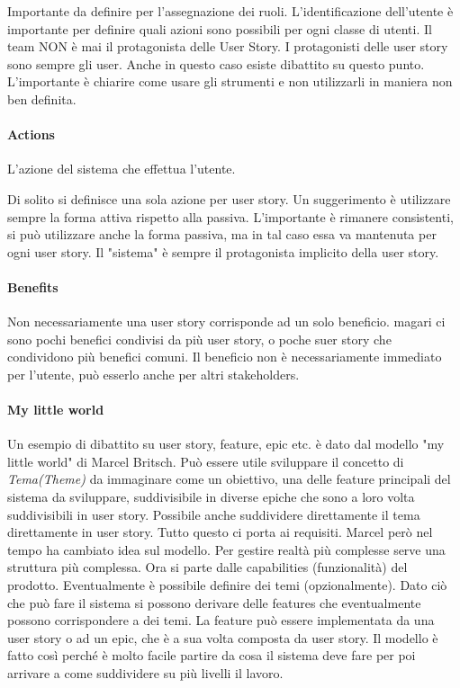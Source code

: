 \noindent Importante da definire per l'assegnazione dei ruoli. L'identificazione dell'utente è importante per definire quali azioni sono possibili per ogni classe di utenti. Il team NON è mai il protagonista delle User Story. I protagonisti delle user story sono sempre gli user. Anche in questo caso esiste dibattito su questo punto. L'importante è chiarire come usare gli strumenti e non utilizzarli in maniera non ben definita.
\paragraph{Actions}
L'azione del sistema che effettua l'utente.

\noindent Di solito si definisce una sola azione per user story. Un suggerimento è utilizzare sempre la forma attiva rispetto alla passiva. L'importante è rimanere consistenti, si può utilizzare anche la forma passiva, ma in tal caso essa va mantenuta per ogni user story. Il "sistema" è sempre il protagonista implicito della user story.
\paragraph{Benefits}
Non necessariamente una user story corrisponde ad un solo beneficio. magari ci sono pochi benefici condivisi da più user story, o poche suer story che condividono più benefici comuni. Il beneficio non è necessariamente immediato per l'utente, può esserlo anche per altri stakeholders.

\paragraph{My little world}
Un esempio di dibattito su user story, feature, epic etc. è dato dal modello "my little world" di Marcel Britsch. Può essere utile sviluppare il concetto di \textit{Tema(Theme)} da immaginare come un obiettivo, una delle feature principali del sistema da sviluppare, suddivisibile in diverse epiche che sono a loro volta suddivisibili in user story. Possibile anche suddividere direttamente il tema direttamente in user story. Tutto questo ci porta ai requisiti.\newline
{}
\noindent Marcel però nel tempo ha cambiato idea sul modello. Per gestire realtà più complesse serve una struttura più complessa. Ora si parte dalle capabilities (funzionalità) del prodotto. Eventualmente è possibile definire dei temi (opzionalmente). Dato ciò che può fare il sistema si possono derivare delle features che eventualmente possono corrispondere a dei temi. La feature può essere implementata da una user story o ad un epic, che è a sua volta composta da user story. Il modello è fatto così perché è molto facile partire da cosa il sistema deve fare per poi arrivare a come suddividere su più livelli il lavoro.

